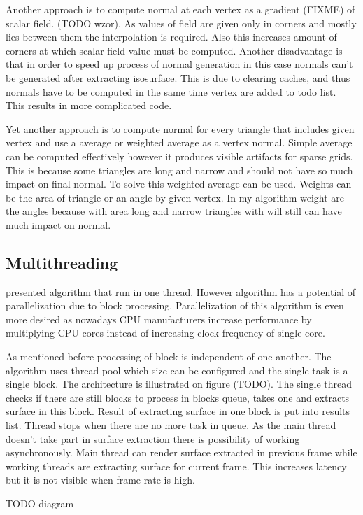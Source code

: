 Another approach is to compute normal at each vertex as a gradient (FIXME) of scalar field. (TODO wzor). As values of field are given only in corners and mostly lies between them the interpolation is required. Also this increases amount of corners at which scalar field value must be computed. Another disadvantage is that in order to speed up process of normal generation in this case normals can't be generated after extracting isosurface. This is due to clearing caches, and thus normals have to be computed in the same time vertex are added to todo list. This results in more complicated code.


Yet another approach is to compute normal for every triangle that includes given vertex and use a average or weighted average as a vertex normal. Simple average can be computed effectively however it produces visible artifacts for sparse grids. This is because some triangles are long and narrow and should not have so much impact on final normal. To solve this weighted average can be used. Weights can be the area of triangle or an angle by given vertex. In my algorithm weight are the angles because with area long and narrow triangles with will still can have much impact on normal. 

\subsection{Multithreading}
\cite{RosenbergBirdwell2008} presented algorithm that run in one thread. However algorithm has a potential of parallelization due to block processing. Parallelization of this algorithm is even more desired as nowadays CPU manufacturers increase performance by multiplying CPU cores instead of increasing clock frequency of single core. 

As mentioned before processing of block is independent of one another. The algorithm uses thread pool which size can be configured and the single task is a single block. The architecture is illustrated on figure (TODO). The single thread checks if there are still blocks to process in blocks queue, takes one and extracts surface in this block. Result of extracting surface in one block is put into results list. Thread stops when there are no more task in queue. As the main thread doesn't take part in surface extraction there is possibility of working asynchronously. Main thread can render surface extracted in previous frame while working threads are extracting surface for current frame. This increases latency but it is not visible when frame rate is high. 

TODO diagram

